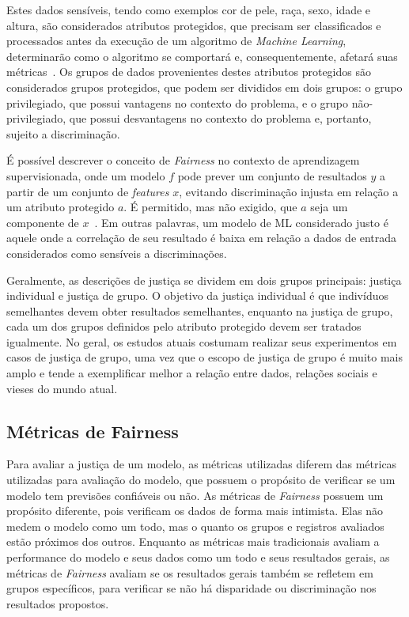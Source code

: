 \documentclass[portugues]{ic-tese}
\begin{document}
Estes dados sensíveis, tendo como exemplos cor de pele, raça, sexo, idade e altura, são considerados atributos protegidos, que precisam ser classificados e processados antes da execução de um algoritmo de \textit{Machine Learning}, determinarão como o algoritmo se comportará e, consequentemente, afetará suas métricas~\citep{Mougan_2022}. Os grupos de dados provenientes destes atributos protegidos são considerados grupos protegidos, que podem ser divididos em dois grupos: o grupo privilegiado, que possui vantagens no contexto do problema, e o grupo não-privilegiado, que possui desvantagens no contexto do problema e, portanto, sujeito a discriminação.

É possível descrever o conceito de \textit{Fairness} no contexto de aprendizagem supervisionada, onde um modelo $f$ pode prever um conjunto de resultados $y$ a partir de um conjunto de \textit{features} $x$, evitando discriminação injusta em relação a um atributo protegido $a$. É permitido, mas não exigido, que $a$ seja um componente de $x$~\citep{Begley_2021}. Em outras palavras, um modelo de ML considerado justo é aquele onde a correlação de seu resultado é baixa em relação a dados de entrada considerados como sensíveis a discriminações.

Geralmente, as descrições de justiça se dividem em dois grupos principais: justiça individual e justiça de grupo. O objetivo da justiça individual é que indivíduos semelhantes devem obter resultados semelhantes, enquanto na justiça de grupo, cada um dos grupos definidos pelo atributo protegido devem ser tratados igualmente. No geral, os estudos atuais costumam realizar seus experimentos em casos de justiça de grupo, uma vez que o escopo de justiça de grupo é muito mais amplo e tende a exemplificar melhor a relação entre dados, relações sociais e vieses do mundo atual.

\subsection{Métricas de Fairness}

Para avaliar a justiça de um modelo, as métricas utilizadas diferem das métricas utilizadas para avaliação do modelo, que possuem o propósito de verificar se um modelo tem previsões confiáveis ou não. As métricas de \textit{Fairness} possuem um propósito diferente, pois verificam os dados de forma mais intimista. Elas não medem o modelo como um todo, mas o quanto os grupos e registros avaliados estão próximos dos outros. Enquanto as métricas mais tradicionais avaliam a performance do modelo e seus dados como um todo e seus resultados gerais, as métricas de \textit{Fairness} avaliam se os resultados gerais também se refletem em grupos específicos, para verificar se não há disparidade ou discriminação nos resultados propostos.
\end{document}
